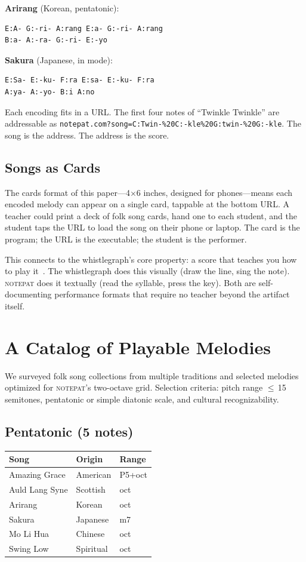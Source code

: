 \documentclass[10pt,letterpaper,twocolumn]{article}
\newcommand{\np}{\textsc{notepat}}
\begin{document}
\textbf{Arirang} (Korean, pentatonic):
\begin{lstlisting}[style=notepat]
E:A- G:-ri- A:rang E:a- G:-ri- A:rang
B:a- A:-ra- G:-ri- E:-yo
\end{lstlisting}

\textbf{Sakura} (Japanese, in mode):
\begin{lstlisting}[style=notepat]
E:Sa- E:-ku- F:ra E:sa- E:-ku- F:ra
A:ya- A:-yo- B:i A:no
\end{lstlisting}

Each encoding fits in a URL. The first four notes of ``Twinkle Twinkle'' are addressable as \texttt{notepat.com?song=C:Twin-\%20C:-kle\%20G:twin-\%20G:-kle}. The song is the address. The address is the score.

\subsection{Songs as Cards}

The cards format of this paper---4$\times$6 inches, designed for phones---means each encoded melody can appear on a single card, tappable at the bottom URL. A teacher could print a deck of folk song cards, hand one to each student, and the student taps the URL to load the song on their phone or laptop. The card is the program; the URL is the executable; the student is the performer.

This connects to the whistlegraph's core property: a score that teaches you how to play it~\citep{scudder2026whistlegraph}. The whistlegraph does this visually (draw the line, sing the note). \np{} does it textually (read the syllable, press the key). Both are self-documenting performance formats that require no teacher beyond the artifact itself.

\section{A Catalog of Playable Melodies}

We surveyed folk song collections from multiple traditions and selected melodies optimized for \np{}'s two-octave grid. Selection criteria: pitch range $\leq$\,15 semitones, pentatonic or simple diatonic scale, and cultural recognizability.

\subsection{Pentatonic (5 notes)}

\begin{tabularx}{\linewidth}{XXX}
\toprule
\textbf{Song} & \textbf{Origin} & \textbf{Range} \\
\midrule
Amazing Grace & American & P5+oct \\
Auld Lang Syne & Scottish & oct \\
Arirang & Korean & oct \\
Sakura & Japanese & m7 \\
Mo Li Hua & Chinese & oct \\
Swing Low & Spiritual & oct \\
\bottomrule
\end{tabularx}
\end{document}
